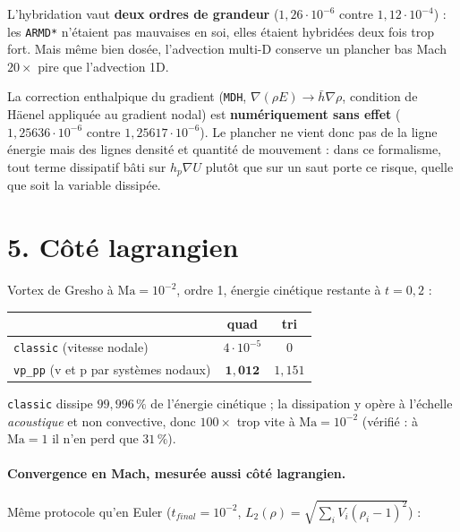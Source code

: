 \documentclass[11pt,a4paper]{article}
\begin{document}
L'hybridation vaut \textbf{deux ordres de grandeur} ($1{,}26\cdot10^{-6}$ contre
$1{,}12\cdot10^{-4}$) : les \texttt{ARMD*} n'étaient pas mauvaises en soi, elles
étaient hybridées deux fois trop fort. Mais même bien dosée, l'advection multi-D
conserve un plancher bas Mach $20\times$ pire que l'advection 1D.

La correction enthalpique du gradient (\texttt{MDH}, $\nabla(\rho E)\to\bar h\nabla\rho$,
condition de Häenel appliquée au gradient nodal) est \textbf{numériquement sans effet}
($1{,}25636\cdot10^{-6}$ contre $1{,}25617\cdot10^{-6}$). Le plancher ne vient donc pas
de la ligne énergie mais des lignes densité et quantité de mouvement : dans ce
formalisme, tout terme dissipatif bâti sur $h_p\nabla U$ plutôt que sur un saut porte
ce risque, quelle que soit la variable dissipée.

\section*{5. Côté lagrangien}

Vortex de Gresho à $\mathrm{Ma}=10^{-2}$, ordre 1, énergie cinétique restante à $t=0{,}2$ :

\begin{table}[h]\centering
\begin{tabular}{lcc}
\toprule
& quad & tri \\
\midrule
\texttt{classic} (vitesse nodale) & $4\cdot10^{-5}$ & $0$ \\
\texttt{vp\_pp} (v et p par systèmes nodaux) & $\mathbf{1{,}012}$ & $1{,}151$ \\
\bottomrule
\end{tabular}
\end{table}

\texttt{classic} dissipe $99{,}996\,\%$ de l'énergie cinétique ; la dissipation y opère
à l'échelle \emph{acoustique} et non convective, donc $100\times$ trop vite à
$\mathrm{Ma}=10^{-2}$ (vérifié : à $\mathrm{Ma}=1$ il n'en perd que $31\,\%$).

\paragraph{Convergence en Mach, mesurée aussi côté lagrangien.} Même protocole qu'en
Euler ($t_{final}=10^{-2}$, $L_2(\rho)=\sqrt{\sum_i V_i(\rho_i-1)^2}$) :
\end{document}
